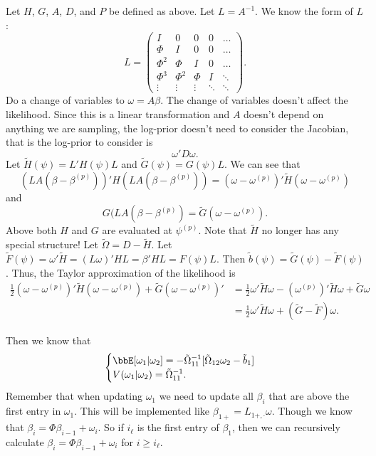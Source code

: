 \documentclass{article}
\begin{document}
Let $H$, $G$, $A$, $D$, and $P$ be defined as above.  Let $L = A^{-1}$.  We know
the form of $L$:
\[
L = 
\begin{pmatrix}
I & 0 & 0 & 0 & \ldots \\
\Phi & I & 0 & 0 & \ldots \\
\Phi^2 & \Phi & I & 0 & \ldots \\
\Phi^3 & \Phi^2 & \Phi & I & \ddots \\
\vdots & \vdots & \vdots & \ddots & \ddots
\end{pmatrix}.
\]
Do a change of variables to $\omega = A \beta$.  The change of
variables doesn't affect the likelihood.  Since this is a linear transformation
and $A$ doesn't depend on anything we are sampling, the log-prior doesn't need
to consider the Jacobian, that is the log-prior to consider is
\[
\omega' D \omega.  
\]
Let $\tilde H(\psi) = L' H(\psi) L$ and $\tilde G(\psi) = G(\psi) L$.  We can
see that
\[
(LA(\beta-\beta^{(p)}))' H (LA(\beta-\beta^{(p)})) = (\omega - \omega^{(p)})' \tilde H
(\omega - \omega^{(p)})
\]
and
\[
G (LA(\beta-\beta^{(p)}) = \tilde G (\omega - \omega^{(p)}).
\]
Above both $H$ and $G$ are evaluated at $\psi^{(p)}$.  Note that $\tilde H$ no longer
has any special structure!  Let $\tilde \Omega = D - \tilde H$.  Let $\tilde
F(\psi) = \omega' \tilde H = (L \omega)' H L = \beta' H L = F(\psi) L$.  Then
$\tilde b(\psi) = \tilde G(\psi) - \tilde F(\psi)$.  Thus, the Taylor
approximation of the likelihood is
\begin{align*}
\frac{1}{2} (\omega - \omega^{(p)})' \tilde H  (\omega - \omega^{(p)}) + \tilde G (\omega
- \omega^{(p)})' 
& = \frac{1}{2} \omega' \tilde H \omega - 
(\omega^{(p)})' \tilde H \omega + \tilde G \omega \\
& = \frac{1}{2} \omega' \tilde H \omega + (\tilde G - \tilde F) \omega.
\end{align*}

Then we know that
\[
\begin{cases}
  \bbE[\omega_1 | \omega_2] =
  - \tilde \Omega_{11}^{-1} [\tilde \Omega_{12} \omega_2 - \tilde b_1] \\
  V(\omega_1 | \omega_2) = \tilde \Omega_{11}^{-1}.
\end{cases}
\]
Remember that when updating $\omega_1$ we need to update all $\beta_i$ that are
above the first entry in $\omega_1$.  This will be implemented like $\beta_{1+}
= L_{1+,\cdot} \omega$.  Though we know that $\beta_i = \Phi \beta_{i-1} +
\omega_i$.  So if $i_\ell$ is the first entry of $\beta_1$, then we can
recursively calculate $\beta_i = \Phi \beta_{i-1} + \omega_i$ for $i \geq
i_\ell$.
\end{document}
